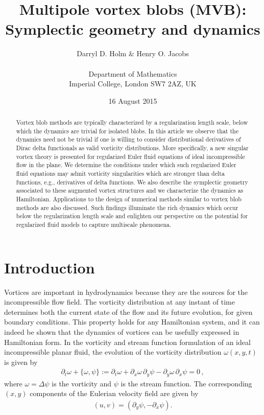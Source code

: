 \documentclass[12pt]{amsart}
\title[Multipole vortex blobs]{Multipole vortex blobs (MVB):\\ Symplectic geometry and dynamics}
\author[D.D. Holm \& H.O. Jacobs]{Darryl D. Holm \& Henry O. Jacobs\\ \\
Department of Mathematics\\
Imperial College, London SW7 2AZ, UK}
\date{16 August 2015}
\theoremstyle{remark}
\begin{document}
\begin{abstract}
Vortex blob methods are typically characterized by a regularization length scale, below which the dynamics are trivial for isolated blobs.
In this article we observe that the dynamics need not be trivial if one is willing to consider distributional derivatives of Dirac delta functionals as valid vorticity distributions.
More specifically, a new singular vortex theory is presented for regularized Euler fluid equations of ideal incompressible flow in the plane.
We determine the conditions under which such regularized Euler fluid equations may admit vorticity singularities which are stronger than delta functions, e.g., derivatives of delta functions.
We also describe the symplectic geometry associated to these augmented vortex structures and we characterize the dynamics as Hamiltonian.
Applications to the design of numerical methods similar to vortex blob methods are also discussed.
Such findings illuminate the rich dynamics which occur below the regularization length scale and
enlighten our perspective on the potential for regularized fluid models to capture multiscale phenomena.
\end{abstract}

\maketitle

\tableofcontents

\section{Introduction}
\label{sec:intro}
Vortices are important in hydrodynamics because they are the sources for the incompressible flow field. The vorticity distribution at any instant of time determines both the current state of the flow and its future evolution, for given boundary conditions. This property holds for any Hamiltonian system, and it can indeed be shown that the dynamics of vortices can be usefully expressed in Hamiltonian form. In the vorticity and stream function formulation of an ideal incompressible planar fluid, the evolution of the vorticity distribution $\omega(x,y,t)$ is given by
\begin{align}
  \partial_t \omega + \{\omega,\psi\} := 
  \partial_t \omega + \partial_x  \omega\,  \partial_y \psi
  - \partial_y \omega \, \partial_x \psi = 0\,, \label{eq:vorticity}
\end{align}
where $\omega = \Delta \psi$ is the vorticity and $\psi$ is the stream function.
The corresponding $(x,y)$ components of the Eulerian velocity field are given by
\begin{align*}
	 (u,v) = (\partial_y \psi , - \partial_x \psi).
\end{align*}
\end{document}
